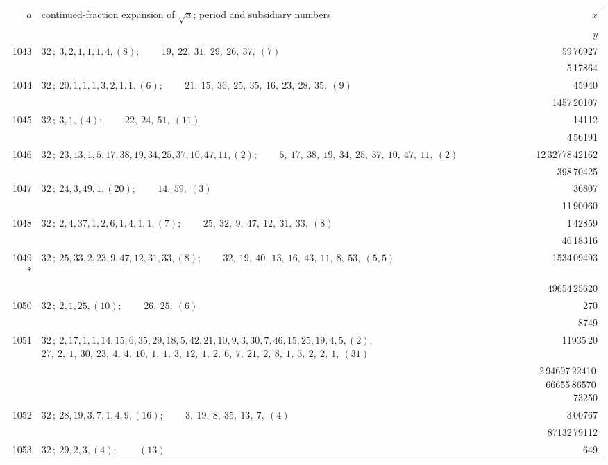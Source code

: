 \documentclass[11pt]{article}
\providecommand{\asterism}{*}
\begin{document}
\renewcommand{\arraystretch}{1.15}
\begin{longtable}{|r|p{}|r|}
\hline
$a$ & continued-fraction expansion of $\sqrt{a}$; period and subsidiary numbers & $x$ \\
 & & $y$ \\
\hline
\endhead
1043 & $32\,;\ 3, 2, 1, 1, 1, 4, (8)$; \ \ \ \ $19,\ 22,\ 31,\ 29,\ 26,\ 37,\ (7)$ & 59\,76927 \\
 & & 5\,17864 \\
\hline
1044 & $32\,;\ 20, 1, 1, 1, 3, 2, 1, 1, (6)$; \ \ \ \ $21,\ 15,\ 36,\ 25,\ 35,\ 16,\ 23,\ 28,\ 35,\ (9)$ & 45940 \\
 & & 1457\,20107 \\
\hline
1045 & $32\,;\ 3, 1, (4)$; \ \ \ \ $22,\ 24,\ 51,\ (11)$ & 14112 \\
 & & 4\,56191 \\
\hline
1046 & $32\,;\ 23, 13, 1, 5, 17, 38, 19, 34, 25, 37, 10, 47, 11, (2)$; \ \ \ \ $5,\ 17,\ 38,\ 19,\ 34,\ 25,\ 37,\ 10,\ 47,\ 11,\ (2)$ & 12\,32778\,42162 \\
 & & 398\,70425 \\
\hline
1047 & $32\,;\ 24, 3, 49, 1, (20)$; \ \ \ \ $14,\ 59,\ (3)$ & 36807 \\
 & & 11\,90060 \\
\hline
1048 & $32\,;\ 2, 4, 37, 1, 2, 6, 1, 4, 1, 1, (7)$; \ \ \ \ $25,\ 32,\ 9,\ 47,\ 12,\ 31,\ 33,\ (8)$ & 1\,42859 \\
 & & 46\,18316 \\
\hline
1049$\asterism$ & $32\,;\ 25, 33, 2, 23, 9, 47, 12, 31, 33, (8)$; \ \ \ \ $32,\ 19,\ 40,\ 13,\ 16,\ 43,\ 11,\ 8,\ 53,\ (5, 5)$ & 1534\,09493 \\
 & & 49654\,25620 \\
\hline
1050 & $32\,;\ 2, 1, 25, (10)$; \ \ \ \ $26,\ 25,\ (6)$ & 270 \\
 & & 8749 \\
\hline
1051 & $32\,;\ 2, 17, 1, 1, 14, 15, 6, 35, 29, 18, 5, 42, 21, 10, 9, 3, 30, 7, 46, 15, 25, 19, 4, 5, (2)$; \ \ \ \ $27,\ 2,\ 1,\ 30,\ 23,\ 4,\ 4,\ 10,\ 1,\ 1,\ 3,\ 12,\ 1,\ 2,\ 6,\ 7,\ 21,\ 2,\ 8,\ 1,\ 3,\ 2,\ 2,\ 1,\ (31)$ & 11935\,20 \\
 & & 2\,94697\,22410\,66655\,86570\,73250 \\
\hline
1052 & $32\,;\ 28, 19, 3, 7, 1, 4, 9, (16)$; \ \ \ \ $3,\ 19,\ 8,\ 35,\ 13,\ 7,\ (4)$ & 3\,00767 \\
 & & 87132\,79112 \\
\hline
1053 & $32\,;\ 29, 2, 3, (4)$; \ \ \ \ $(13)$ & 649 \\

\end{longtable}
\end{document}
